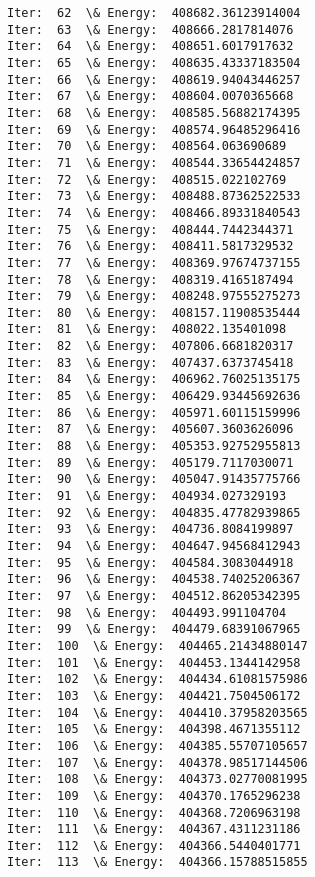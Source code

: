 \documentclass[11pt]{article}
\begin{document}
\begin{Verbatim}[commandchars=\\\{\}]
Iter:  62  \& Energy:  408682.36123914004
Iter:  63  \& Energy:  408666.2817814076
Iter:  64  \& Energy:  408651.6017917632
Iter:  65  \& Energy:  408635.43337183504
Iter:  66  \& Energy:  408619.94043446257
Iter:  67  \& Energy:  408604.0070365668
Iter:  68  \& Energy:  408585.56882174395
Iter:  69  \& Energy:  408574.96485296416
Iter:  70  \& Energy:  408564.063690689
Iter:  71  \& Energy:  408544.33654424857
Iter:  72  \& Energy:  408515.022102769
Iter:  73  \& Energy:  408488.87362522533
Iter:  74  \& Energy:  408466.89331840543
Iter:  75  \& Energy:  408444.7442344371
Iter:  76  \& Energy:  408411.5817329532
Iter:  77  \& Energy:  408369.97674737155
Iter:  78  \& Energy:  408319.4165187494
Iter:  79  \& Energy:  408248.97555275273
Iter:  80  \& Energy:  408157.11908535444
Iter:  81  \& Energy:  408022.135401098
Iter:  82  \& Energy:  407806.6681820317
Iter:  83  \& Energy:  407437.6373745418
Iter:  84  \& Energy:  406962.76025135175
Iter:  85  \& Energy:  406429.93445692636
Iter:  86  \& Energy:  405971.60115159996
Iter:  87  \& Energy:  405607.3603626096
Iter:  88  \& Energy:  405353.92752955813
Iter:  89  \& Energy:  405179.7117030071
Iter:  90  \& Energy:  405047.91435775766
Iter:  91  \& Energy:  404934.027329193
Iter:  92  \& Energy:  404835.47782939865
Iter:  93  \& Energy:  404736.8084199897
Iter:  94  \& Energy:  404647.94568412943
Iter:  95  \& Energy:  404584.3083044918
Iter:  96  \& Energy:  404538.74025206367
Iter:  97  \& Energy:  404512.86205342395
Iter:  98  \& Energy:  404493.991104704
Iter:  99  \& Energy:  404479.68391067965
Iter:  100  \& Energy:  404465.21434880147
Iter:  101  \& Energy:  404453.1344142958
Iter:  102  \& Energy:  404434.61081575986
Iter:  103  \& Energy:  404421.7504506172
Iter:  104  \& Energy:  404410.37958203565
Iter:  105  \& Energy:  404398.4671355112
Iter:  106  \& Energy:  404385.55707105657
Iter:  107  \& Energy:  404378.98517144506
Iter:  108  \& Energy:  404373.02770081995
Iter:  109  \& Energy:  404370.1765296238
Iter:  110  \& Energy:  404368.7206963198
Iter:  111  \& Energy:  404367.4311231186
Iter:  112  \& Energy:  404366.5440401771
Iter:  113  \& Energy:  404366.15788515855

    \end{Verbatim}

    \begin{center}
    \end{center}
    { \hspace*{\fill} \\}
    
\end{document}
